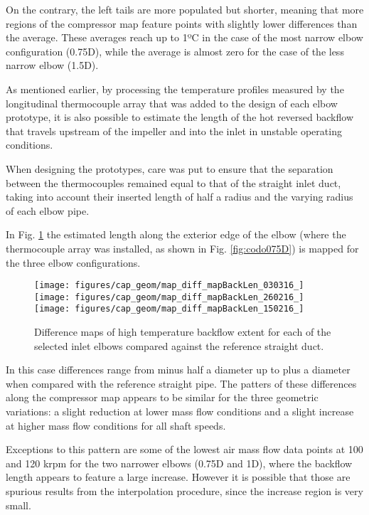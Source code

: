 On the contrary, the left tails are more populated but shorter, meaning that more regions of the compressor map feature points with slightly lower differences than the average. These averages reach up to 1ºC in the case of the most narrow elbow configuration (0.75D), while the average is almost zero for the case of the less narrow elbow (1.5D).

As mentioned earlier, by processing the temperature profiles measured by the longitudinal thermocouple array that was added to the design of each elbow prototype, it is also possible to estimate the length of the hot reversed backflow that travels upstream of the impeller and into the inlet in unstable operating conditions.

When designing the prototypes, care was put to ensure that the separation between the thermocouples remained equal to that of the straight inlet duct, taking into account their inserted length of half a radius and the varying radius of each elbow pipe.

In Fig. \ref{fig:map_diff_backL} the estimated length along the exterior edge of the elbow (where the thermocouple array was installed, as shown in Fig. \ref{fig:codo075D}) is mapped for the three elbow configurations.

\begin{figure}[h!]
\centering
\texttt{[image: figures/cap\_geom/map\_diff\_mapBackLen\_030316\_]}\hspace{4mm}
\texttt{[image: figures/cap\_geom/map\_diff\_mapBackLen\_260216\_]}\\[3mm]
\texttt{[image: figures/cap\_geom/map\_diff\_mapBackLen\_150216\_]}\hspace{4mm}
\caption{Difference maps of high temperature backflow extent for each of the selected inlet elbows compared against the reference straight duct.}
\label{fig:map_diff_backL}
\end{figure}

In this case differences range from minus half a diameter up to plus a diameter when compared with the reference straight pipe. The patters of these differences along the compressor map appears to be similar for the three geometric variations: a slight reduction at lower mass flow conditions and a slight increase at higher mass flow conditions for all shaft speeds.

Exceptions to this pattern are some of the lowest air mass flow data points at 100 and 120 krpm for the two narrower elbows (0.75D and 1D), where the backflow length appears to feature a large increase. However it is possible that those are spurious results from the interpolation procedure, since the increase region is very small.

